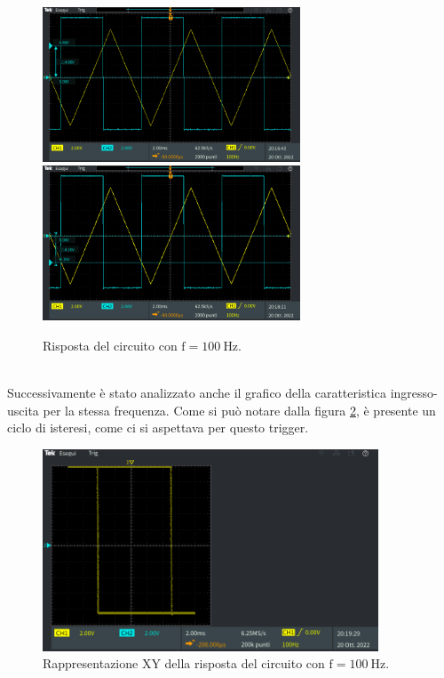 \documentclass{report}
\begin{document}
\begin{figure}[h!]
	\centering
	\includegraphics[height=4.6cm]{immagini/TEK00017}
	\includegraphics[height=4.6cm]{immagini/TEK00018}
	\caption{Risposta del circuito con $\mathrm{f= \SI{100}{\hertz}}$.}
	\label{figura:uscita21}
\end{figure}
\\\indent Successivamente è stato analizzato anche il grafico della caratteristica ingresso-uscita per la stessa frequenza. Come si può notare dalla figura \ref{figura:uscita22}, è presente un ciclo di isteresi, come ci si aspettava per questo trigger.
\begin{figure}[h!]
	\centering
	\includegraphics[height=6cm]{immagini/TEK00019}
	\caption{Rappresentazione XY della risposta del circuito con $\mathrm{f= \SI{100}{\hertz}}$.}
	\label{figura:uscita22}
\end{figure}
\end{document}
